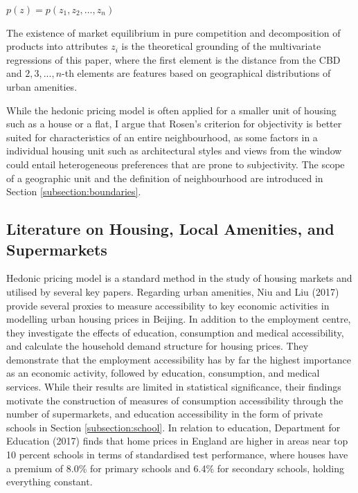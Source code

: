 \documentclass{article}
\begin{document}
\begin{center}
    $p ( z ) = p \left( z _ { 1 } , z _ { 2 } , \dots , z _ { n } \right)$
\end{center}

The existence of market equilibrium in pure competition and decomposition of products into attributes $z_i$ is the theoretical grounding of the multivariate regressions of this paper, where the first element is the distance from the CBD and $2, 3, ..., n$-th elements are features based on geographical distributions of urban amenities.

While the hedonic pricing model is often applied for a smaller unit of housing such as a house or a flat, I argue that Rosen's criterion for objectivity is better suited for characteristics of an entire neighbourhood, as some factors in a individual housing unit such as architectural styles and views from the window could entail heterogeneous preferences that are prone to subjectivity. The scope of a geographic unit and the definition of neighbourhood are introduced in Section \ref{subsection:boundaries}.

\subsection{Literature on Housing, Local Amenities, and Supermarkets} \label{subsection:lit:supermarkets}
Hedonic pricing model is a standard method in the study of housing markets and utilised by several key papers. Regarding urban amenities, Niu and Liu (2017) provide several proxies to measure accessibility to key economic activities in modelling urban housing prices in Beijing. In addition to the employment centre, they investigate the effects of education, consumption and medical accessibility, and calculate the household demand structure for housing prices. They demonstrate that the employment accessibility has by far the highest importance as an economic activity, followed by education, consumption, and medical services. While their results are limited in statistical significance, their findings motivate the construction of measures of consumption accessibility through the number of supermarkets, and education accessibility in the form of private schools in Section \ref{subsection:school}. In relation to education, Department for Education (2017) finds that home prices in England are higher in areas near top 10 percent schools in terms of standardised test performance, where houses have a premium of 8.0\% for primary schools and 6.4\% for secondary schools, holding everything constant.
\end{document}
